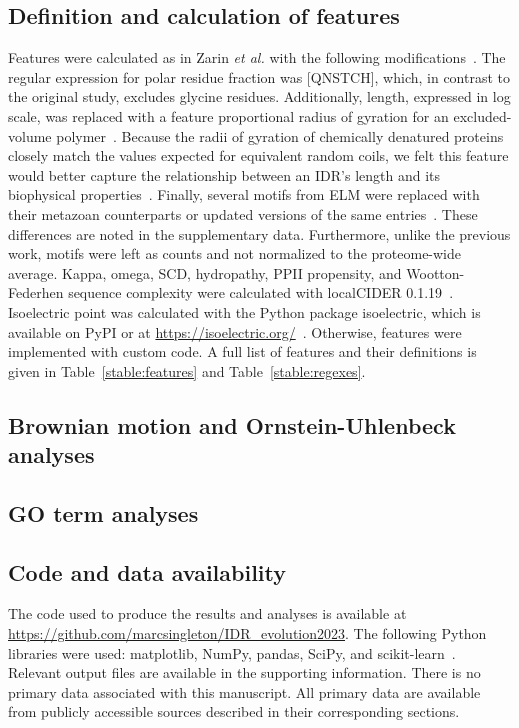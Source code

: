 \subsection{Definition and calculation of features}
Features were calculated as in Zarin \textit{et al.} with the following modifications~\cite{Zarin2019}. The regular expression for polar residue fraction was [QNSTCH], which, in contrast to the original study, excludes glycine residues. Additionally, length, expressed in log scale, was replaced with a feature proportional radius of gyration for an excluded-volume polymer~\cite{Flory1949}. Because the radii of gyration of chemically denatured proteins closely match the values expected for equivalent random coils, we felt this feature would better capture the relationship between an IDR's length and its biophysical properties~\cite{Kohn2004}. Finally, several motifs from ELM were replaced with their metazoan counterparts or updated versions of the same entries~\cite{Kumar2021}. These differences are noted in the supplementary data. Furthermore, unlike the previous work, motifs were left as counts and not normalized to the proteome-wide average. Kappa, omega, SCD, hydropathy, PPII propensity, and Wootton-Federhen sequence complexity were calculated with localCIDER 0.1.19~\cite{Holehouse2017}. Isoelectric point was calculated with the Python package isoelectric, which is available on PyPI or at \url{https://isoelectric.org/}~\cite{Kozlowski2016}. Otherwise, features were implemented with custom code. A full list of features and their definitions is given in Table~\ref{stable:features} and Table~\ref{stable:regexes}.

\subsection{Brownian motion and Ornstein-Uhlenbeck analyses}

\subsection{GO term analyses}

\subsection{Code and data availability}
\begin{sloppypar}
The code used to produce the results and analyses is available at \url{https://github.com/marcsingleton/IDR_evolution2023}. The following Python libraries were used: matplotlib, NumPy, pandas, SciPy, and scikit-learn~\cite{Hunter2007, Harris2020, McKinney2010, Virtanen2020, Pedregosa2011}. Relevant output files are available in the supporting information. There is no primary data associated with this manuscript. All primary data are available from publicly accessible sources described in their corresponding sections.
\end{sloppypar}